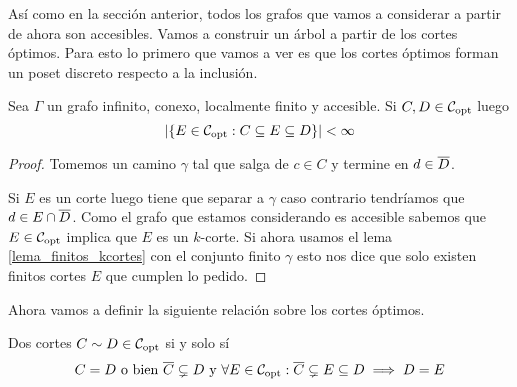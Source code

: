 \documentclass[tesis.tex]{subfiles}
\begin{document}
Así como en la sección anterior, todos los grafos que vamos a considerar a partir de ahora son accesibles.
Vamos a construir un árbol a partir de los cortes óptimos.
Para esto lo primero que vamos a ver es que los cortes óptimos forman un poset discreto respecto a la inclusión.

\begin{lema}\label{lema_intermedios}
	Sea $\Gamma$ un grafo infinito, conexo, localmente finito y accesible.
	Si $C,D \in {\cal C}_{\text{opt}}$ luego 
	\[
	|\{ E \in {\cal C}_{\text{opt}} : C \subseteq E \subseteq D \}| < \infty
	\]
\end{lema}
\begin{proof}
	Tomemos un camino $\gamma$ tal que salga de $c \in C$ y termine en $d \in \overline D$.
	
	Si $E$ es un corte luego tiene que separar a $\gamma$ caso contrario tendríamos que $d \in E \cap \overline D$.
	Como el grafo que estamos considerando es accesible sabemos que $E \in {\cal C}_{\text{opt}}$ implica que $E$ es un $k$-corte.
	Si ahora usamos el lema \ref{lema_finitos_kcortes} con el conjunto finito $\gamma$ esto nos dice que solo existen finitos cortes $E$ que cumplen lo pedido.
\end{proof}

Ahora vamos a definir la siguiente relación sobre los cortes óptimos.

\begin{deff}
	Dos cortes $C \sim D \in {\cal C}_{\text{opt}}$ si y solo sí
	\[
		C = D \ \text{o bien} \ \overline C \subsetneq D \ \text{y} \ \forall E \in {\cal C}_{\text{opt}} : \overline C \subsetneq E \subseteq D \implies D = E
	\]
\end{deff}
\end{document}
